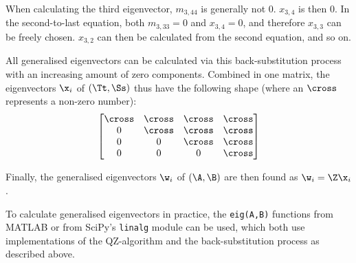 When calculating the third eigenvector, $m_{3,44}$ is generally not $0$.
$x_{3,4}$ is then $0$. In the second-to-last equation, both $m_{3,33} = 0$
and $x_{3,4} = 0$, and therefore $x_{3,3}$ can be freely chosen. $x_{3,2}$
can then be calculated from the second equation, and so on.

All generalised eigenvectors can be calculated via this back-substitution
process with an increasing amount of zero components. Combined in one matrix,
the eigenvectors $\x_i$ of $(\Tt,\Ss)$ thus have the following shape (where
an $\cross$ represents a non-zero number):
\[
\begin{bmatrix}
\cross & \cross & \cross & \cross \\
     0 & \cross & \cross & \cross \\
     0 &      0 & \cross & \cross \\
     0 &      0 &      0 & \cross \\
\end{bmatrix}
\]

Finally, the generalised eigenvectors $\w_i$ of $(\A, \B)$ are then found as
$\w_i = \Z \x_i$.


To calculate generalised eigenvectors in practice, the \texttt{eig(A,B)}
functions from MATLAB or from SciPy's \texttt{linalg} module can be used,
which both use implementations of the QZ-algorithm and the back-substitution
process as described above.
